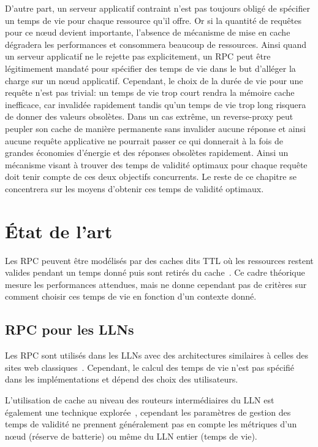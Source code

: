 D'autre part, un serveur applicatif contraint n'est pas toujours obligé de spécifier un temps de vie pour chaque ressource qu'il offre.
Or si la quantité de requêtes pour ce nœud devient importante, l'absence de mécanisme de mise en cache dégradera les performances et consommera beaucoup de ressources.
Ainsi quand un serveur applicatif ne le rejette pas explicitement, un \ac{RPC} peut être légitimement mandaté pour spécifier des temps de vie dans le but d'alléger la charge sur un nœud applicatif.
Cependant, le choix de la durée de vie pour une requête n'est pas trivial: un temps de vie trop court rendra la mémoire cache inefficace, car invalidée rapidement tandis qu'un temps de vie trop long risquera de donner des valeurs obsolètes.
Dans un cas extrême, un reverse-proxy peut peupler son cache de manière permanente sans invalider aucune réponse et ainsi aucune requête applicative ne pourrait passer ce qui donnerait à la fois de grandes économies d'énergie et des réponses obsolètes rapidement.
Ainsi un mécanisme visant à trouver des temps de validité optimaux pour chaque requête doit tenir compte de ces deux objectifs concurrents.
Le reste de ce chapitre se concentrera sur les moyens d'obtenir ces temps de validité optimaux.

\section{État de l'art}
\label{cache:related}

Les \ac{RPC} peuvent être modélisés par des caches dits \acl{TTL} où les ressources restent valides pendant un temps donné puis sont retirés du cache~\cite{berger2014exact}.
Ce cadre théorique mesure les performances attendues, mais ne donne cependant pas de critères sur comment choisir ces temps de vie en fonction d'un contexte donné.

\subsection{\ac{RPC} pour les \ac{LLN}s}

Les \ac{RPC} sont utilisés dans les \ac{LLN}s avec des architectures similaires à celles des sites web classiques~\cite{colitti2011integrating, colitti2011rest}.
Cependant, le calcul des temps de vie n'est pas spécifié dans les implémentations et dépend des choix des utilisateurs.

L'utilisation de cache au niveau des routeurs intermédiaires du \ac{LLN} est également une technique explorée~\cite{duquennoy2011leveraging}, cependant les paramètres de gestion des temps de validité ne prennent généralement pas en compte les métriques d'un nœud (réserve de batterie) ou même du \ac{LLN} entier (temps de vie).

